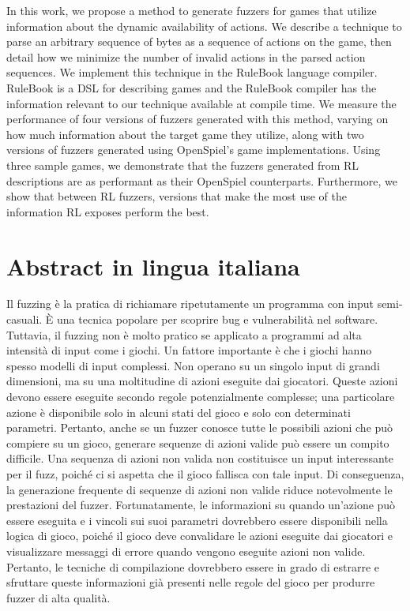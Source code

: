 \documentclass{Configuration_Files/PoliMi3i_thesis}
\begin{document}
In this work, we propose a method to generate fuzzers for games that utilize information about the dynamic availability of actions.
We describe a technique to parse an arbitrary sequence of bytes as a sequence of actions on the game, then detail how we minimize the number of invalid actions in the parsed action sequences.
We implement this technique in the RuleBook language compiler. RuleBook is a DSL for describing games and the RuleBook compiler has the information relevant to our technique available at compile time.
We measure the performance of four versions of fuzzers generated with this method, varying on how much information about the target game they utilize, along with two versions of fuzzers generated using OpenSpiel's game implementations.
Using three sample games, we demonstrate that the fuzzers generated from RL descriptions are as performant as their OpenSpiel counterparts.
Furthermore, we show that between RL fuzzers, versions that make the most use of the information RL exposes perform the best.

\chapter*{Abstract in lingua italiana}
Il fuzzing è la pratica di richiamare ripetutamente un programma con input semi-casuali.
È una tecnica popolare per scoprire bug e vulnerabilità nel software.
Tuttavia, il fuzzing non è molto pratico se applicato a programmi ad alta intensità di input come i giochi.
Un fattore importante è che i giochi hanno spesso modelli di input complessi.
Non operano su un singolo input di grandi dimensioni, ma su una moltitudine di azioni eseguite dai giocatori.
Queste azioni devono essere eseguite secondo regole potenzialmente complesse; una particolare azione è disponibile solo in alcuni stati del gioco e solo con determinati parametri.
Pertanto, anche se un fuzzer conosce tutte le possibili azioni che può compiere su un gioco, generare sequenze di azioni valide può essere un compito difficile.
Una sequenza di azioni non valida non costituisce un input interessante per il fuzz, poiché ci si aspetta che il gioco fallisca con tale input.
Di conseguenza, la generazione frequente di sequenze di azioni non valide riduce notevolmente le prestazioni del fuzzer.
Fortunatamente, le informazioni su quando un'azione può essere eseguita e i vincoli sui suoi parametri dovrebbero essere disponibili nella logica di gioco, poiché il gioco deve convalidare le azioni eseguite dai giocatori e visualizzare messaggi di errore quando vengono eseguite azioni non valide.
Pertanto, le tecniche di compilazione dovrebbero essere in grado di estrarre e sfruttare queste informazioni già presenti nelle regole del gioco per produrre fuzzer di alta qualità.
\end{document}
